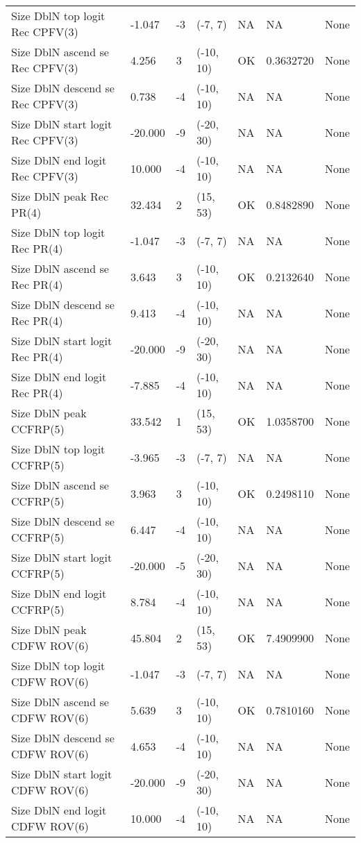 \documentclass[11pt,
  english,
  letterpaper,
]{article}
\begin{document}
\begin{landscape}
\begin{longtable}[t]{>{\raggedright\arraybackslash}p{7cm}lllll>{\raggedright\arraybackslash}p{4cm}}
Size DblN top logit Rec CPFV(3) & -1.047 & -3 & (-7, 7) & NA & NA & None\\
Size DblN ascend se Rec CPFV(3) & 4.256 & 3 & (-10, 10) & OK & 0.3632720 & None\\
Size DblN descend se Rec CPFV(3) & 0.738 & -4 & (-10, 10) & NA & NA & None\\
Size DblN start logit Rec CPFV(3) & -20.000 & -9 & (-20, 30) & NA & NA & None\\
Size DblN end logit Rec CPFV(3) & 10.000 & -4 & (-10, 10) & NA & NA & None\\
Size DblN peak Rec PR(4) & 32.434 & 2 & (15, 53) & OK & 0.8482890 & None\\
Size DblN top logit Rec PR(4) & -1.047 & -3 & (-7, 7) & NA & NA & None\\
Size DblN ascend se Rec PR(4) & 3.643 & 3 & (-10, 10) & OK & 0.2132640 & None\\
Size DblN descend se Rec PR(4) & 9.413 & -4 & (-10, 10) & NA & NA & None\\
Size DblN start logit Rec PR(4) & -20.000 & -9 & (-20, 30) & NA & NA & None\\
Size DblN end logit Rec PR(4) & -7.885 & -4 & (-10, 10) & NA & NA & None\\
Size DblN peak CCFRP(5) & 33.542 & 1 & (15, 53) & OK & 1.0358700 & None\\
Size DblN top logit CCFRP(5) & -3.965 & -3 & (-7, 7) & NA & NA & None\\
Size DblN ascend se CCFRP(5) & 3.963 & 3 & (-10, 10) & OK & 0.2498110 & None\\
Size DblN descend se CCFRP(5) & 6.447 & -4 & (-10, 10) & NA & NA & None\\
Size DblN start logit CCFRP(5) & -20.000 & -5 & (-20, 30) & NA & NA & None\\
Size DblN end logit CCFRP(5) & 8.784 & -4 & (-10, 10) & NA & NA & None\\
Size DblN peak CDFW ROV(6) & 45.804 & 2 & (15, 53) & OK & 7.4909900 & None\\
Size DblN top logit CDFW ROV(6) & -1.047 & -3 & (-7, 7) & NA & NA & None\\
Size DblN ascend se CDFW ROV(6) & 5.639 & 3 & (-10, 10) & OK & 0.7810160 & None\\
Size DblN descend se CDFW ROV(6) & 4.653 & -4 & (-10, 10) & NA & NA & None\\
Size DblN start logit CDFW ROV(6) & -20.000 & -9 & (-20, 30) & NA & NA & None\\
Size DblN end logit CDFW ROV(6) & 10.000 & -4 & (-10, 10) & NA & NA & None\\

\end{longtable}
\end{landscape}
\end{document}
